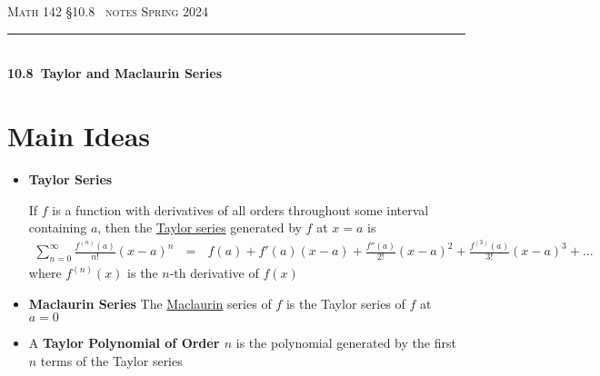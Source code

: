 \documentclass{article}
\def\chapt{10.8}
\def\chaptname{Taylor and Maclaurin Series}
\begin{document}
\noindent
{\scshape Math 142} \hfill {\scshape \S\chapt~ notes} \hfill {\scshape Spring 2024}

\smallskip

\hrule

\bigskip

\hfill
\\

{
\huge
\noindent
\textbf{\chapt~\chaptname}
}

\section*{Main Ideas}

\begin{itemize}

\item
\textbf{Taylor Series}

If $f$ is a function with derivatives of all orders throughout some interval containing
$a$, then the \underline{Taylor series} generated by $f$ at $x=a$ is
\begin{gather*}
\sum_{n=0}^{\infty} \frac{f^{(n)}(a)}{n!}(x-a)^n
~~~=~~~
f(a)+f'(a)(x-a)+\frac{f''(a)}{2!}(x-a)^2+\frac{f^{(3)}(a)}{3!}(x-a)^3+...
\end{gather*}
where $f^{(n)}(x)$ is the $n$-th derivative of $f(x)$
\\

\item
\textbf{Maclaurin Series}
The \underline{Maclaurin} series of $f$ is the Taylor series of $f$ at $a=0$
\\

\item
A \textbf{Taylor Polynomial of Order $n$} is the polynomial generated by 
the first $n$ terms of the Taylor series

\end{itemize}
\end{document}
